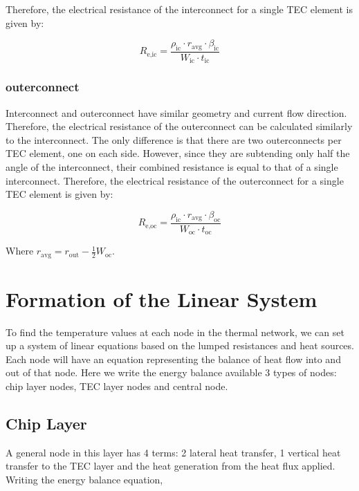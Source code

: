 \documentclass[10pt,a4paper,twocolumn]{article}
\begin{document}
Therefore, the electrical resistance of the interconnect for a single TEC element is given by:

\begin{equation}
	R_{\text{e,ic}} = \frac{\rho_{\text{ic}} \cdot r_{\text{avg}} \cdot \beta_{\text{ic}}}{W_{\text{ic}} \cdot t_{\text{ic}}}
\end{equation}

\subsubsection{outerconnect}

Interconnect and outerconnect have similar geometry and current flow direction. Therefore, the electrical resistance of the outerconnect can be calculated similarly to the interconnect. The only difference is that there are two outerconnects per TEC element, one on each side. However, since they are subtending only half the angle of the interconnect, their combined resistance is equal to that of a single interconnect. Therefore, the electrical resistance of the outerconnect for a single TEC element is given by:

\begin{equation}
	R_{\text{e,oc}} = \frac{\rho_{\text{ic}} \cdot r_{\text{avg}} \cdot \beta_{\text{oc}}}{W_{\text{oc}} \cdot t_{\text{oc}}}
\end{equation}

Where $r_{\text{avg}} = r_{\text{out}} - \frac{1}{2}W_{\text{oc}}$.

\section{Formation of the Linear System}

To find the temperature values at each node in the thermal network, we can set up a system of linear equations based on the lumped resistances and heat sources. Each node will have an equation representing the balance of heat flow into and out of that node. Here we write the energy balance available 3 types of nodes: chip layer nodes, TEC layer nodes and central node.

\subsection{Chip Layer}

A general node in this layer has 4 terms: 2 lateral heat transfer, 1 vertical heat transfer to the TEC layer and the heat generation from the heat flux applied. Writing the energy balance equation,
\end{document}

